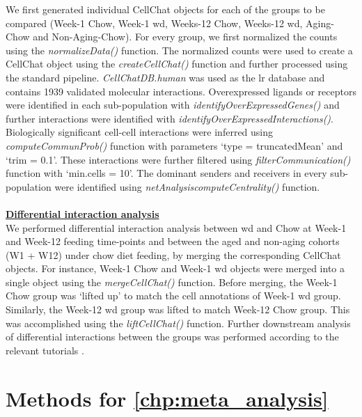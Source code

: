 We first generated individual CellChat objects for each of the groups to be compared (Week-1 Chow, Week-1 \gls{wd}, Weeks-12 Chow, Weeks-12 \gls{wd}, Aging-Chow and Non-Aging-Chow). For every group, we first normalized the counts using the \textit{normalizeData()} function. The normalized counts were used to create a CellChat object using the \textit{createCellChat()} function and further processed using the standard pipeline. \textit{CellChatDB.human} was used as the \gls{lr} database and contains 1939 validated molecular interactions. Overexpressed ligands or receptors were identified in each sub-population with \textit{identifyOverExpressedGenes()} and further interactions were identified with \textit{identifyOverExpressedInteractions()}. Biologically significant cell-cell interactions were inferred using \textit{computeCommunProb()} function with parameters `type = truncatedMean' and `trim = 0.1'. These interactions were further filtered using \textit{filterCommunication()} function with `min.cells = 10'. The dominant senders and receivers in every sub-population were identified using \textit{netAnalysis\textunderscore computeCentrality()} function.\\\\


\underline{\normalsize \textbf{Differential interaction analysis}}\\

We performed differential interaction analysis between \gls{wd} and Chow at Week-1 and Week-12 feeding time-points and between the aged and non-aging cohorts (W1 + W12) under chow diet feeding, by merging the corresponding CellChat objects. For instance, Week-1 Chow and Week-1 \gls{wd} objects were merged into a single object using the \textit{mergeCellChat()} function. Before merging, the Week-1 Chow group was ‘lifted up’ to match the cell annotations of Week-1 \gls{wd} group. Similarly, the Week-12 \gls{wd} group was lifted to match Week-12 Chow group. This was accomplished using the \textit{liftCellChat()} function. Further downstream analysis of differential interactions between the groups was performed according to the relevant tutorials \textbf{\cite{jin_comparison_nodate-1,jin_comparison_nodate}}.



\section{Methods for \autoref{chp:meta_analysis}}
\label{sec:chp3_methods}

